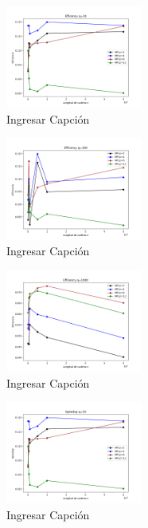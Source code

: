 \begin{figure}[H]
    \centerline{
        \includegraphics[width=0.4\textwidth]{graficos/efficency_q10.png}
    }
    \caption{Ingresar Capción}
    \label{grafico:efficency_q10}
\end{figure}
\begin{figure}[H]
    \centerline{
        \includegraphics[width=0.4\textwidth]{graficos/efficency_q100.png}
    }
    \caption{Ingresar Capción}
    \label{grafico:efficency_q100}
\end{figure}
\begin{figure}[H]
    \centerline{
        \includegraphics[width=0.4\textwidth]{graficos/efficency_q1000.png}
    }
    \caption{Ingresar Capción}
    \label{grafico:efficency_q1000}
\end{figure}
\begin{figure}[H]
    \centerline{
        \includegraphics[width=0.4\textwidth]{graficos/speedup_q10.png}
    }
    \caption{Ingresar Capción}
    \label{grafico:speedup_q10}
\end{figure}
